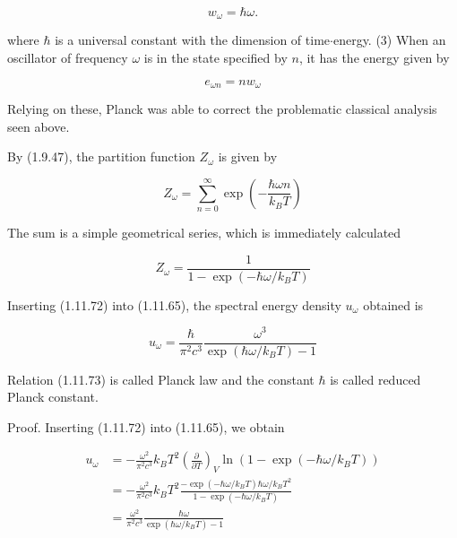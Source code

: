 \documentclass{article}
\begin{document}
\begin{equation*}
w_{\omega}=\hbar \omega . \tag{1.11.69}
\end{equation*}
 
where $\hbar$ is a universal constant with the dimension of time$\cdot$energy.
(3) When an oscillator of frequency $\omega$ is in the state specified by $n$, it has the energy given by
 
\begin{equation*}
e_{\omega n}=n w_{\omega} \tag{1.11.70}
\end{equation*}
 

Relying on these, Planck was able to correct the problematic classical analysis seen above.

By (1.9.47), the partition function $Z_{\omega}$ is given by
 
\begin{equation*}
Z_{\omega}=\sum_{n=0}^{\infty} \exp \left(-\frac{\hbar \omega n}{k_{B} T}\right) \tag{1.11.71}
\end{equation*}
 

The sum is a simple geometrical series, which is immediately calculated
 
\begin{equation*}
Z_{\omega}=\frac{1}{1-\exp \left(-\hbar \omega / k_{B} T\right)} \tag{1.11.72}
\end{equation*}
 

Inserting (1.11.72) into (1.11.65), the spectral energy density $u_{\omega}$ obtained is
 
\begin{equation*}
u_{\omega}=\frac{\hbar}{\pi^{2} c^{3}} \frac{\omega^{3}}{\exp \left(\hbar \omega / k_{B} T\right)-1} \tag{1.11.73}
\end{equation*}
 

Relation (1.11.73) is called Planck law and the constant $\hbar$ is called reduced Planck constant.

Proof. Inserting (1.11.72) into (1.11.65), we obtain
 
\begin{align*}
u_{\omega} & =-\frac{\omega^{2}}{\pi^{2} c^{3}} k_{B} T^{2}\left(\frac{\partial}{\partial T}\right)_{V} \ln \left(1-\exp \left(-\hbar \omega / k_{B} T\right)\right)  \tag{1.11.74}\\
& =-\frac{\omega^{2}}{\pi^{2} c^{3}} k_{B} T^{2} \frac{-\exp \left(-\hbar \omega / k_{B} T\right) \hbar \omega / k_{B} T^{2}}{1-\exp \left(-\hbar \omega / k_{B} T\right)} \\
& =\frac{\omega^{2}}{\pi^{2} c^{3}} \frac{\hbar \omega}{\exp \left(\hbar \omega / k_{B} T\right)-1}
\end{align*}
 
\end{document}
